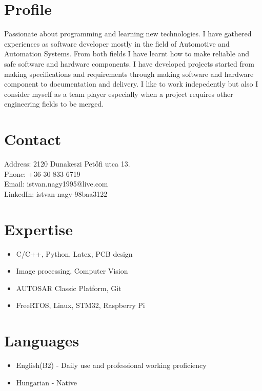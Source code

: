 \documentclass[11pt,oneslide,a4paper,titlepage]{article}
\begin{document}
\begin{tcolorbox}
	\begin{minipage}[t]{8cm}
		\vspace*{-0.5cm}
		\begin{tcolorbox}[grow to left by=0.6cm,colback=gray!25,colframe=white]
			\section*{Profile}
			Passionate about programming and learning new technologies. I have gathered experiences as software developer mostly in the field of Automotive and Automation Systems. From both fields I have learnt how to make reliable and safe software and hardware components. \newline
			I have developed projects started from making specifications and requirements through making software and hardware component to documentation and delivery. \newline
			I like to work indepedently but also I consider myself as a team player especially when a project requires other engineering fields to be merged.

			\section*{Contact}
			Address: 2120 Dunakeszi Petőfi utca 13. \\
			Phone: +36 30 833 6719 \\
			Email: istvan.nagy1995@live.com \\
			LinkedIn: istvan-nagy-98baa3122 \\

			\section*{Expertise}
			\begin{itemize}
				\item{C/C++, Python, Latex, PCB design}
				\item{Image processing, Computer Vision}
				\item{AUTOSAR Classic Platform, Git}
				\item{FreeRTOS, Linux, STM32, Raspberry Pi}
			\end{itemize}
			
			\section*{Languages}
			\begin{itemize}
				\item{English(B2) - Daily use and professional working proficiency}
				\item{Hungarian - Native}
			\end{itemize}
			

\end{tcolorbox}
\end{minipage}
\end{tcolorbox}
\end{document}
